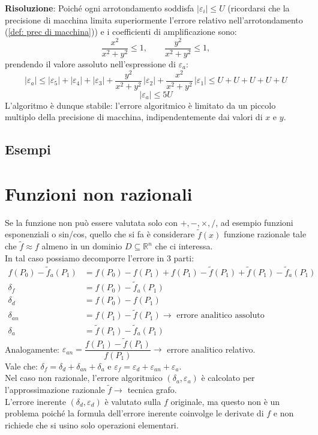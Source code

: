 \documentclass[12pt,a4paper,]{report}
\begin{document}
\noindent
\textbf{Risoluzione}: Poiché ogni arrotondamento soddisfa $|\varepsilon_i| \leq U$ (ricordarsi che la precisione di macchina limita superiormente l'errore relativo nell'arrotondamento (\autoref{def: prec di macchina})) e i coefficienti di amplificazione sono:
\[
  \frac{x^2}{x^2+y^2} \leq 1, \qquad \frac{y^2}{x^2+y^2} \leq 1,
\]
prendendo il valore assoluto nell'espressione di $\varepsilon_a$:
\[
  |\varepsilon_a| \leq |\varepsilon_5| + |\varepsilon_4| + |\varepsilon_3|
  + \frac{y^2}{x^2+y^2}\,|\varepsilon_2| + \frac{x^2}{x^2+y^2}\,|\varepsilon_1|
  \leq U + U + U + U + U
\]
\[
  \boxed{|\varepsilon_a| \leq 5U}
\]
L'algoritmo è dunque stabile: l'errore algoritmico è limitato da un piccolo multiplo della precisione di macchina, indipendentemente dai valori di $x$ e $y$.



\subsection{Esempi}

\section{Funzioni non razionali}
Se la funzione non può essere valutata solo con $+,-,\times, /$, ad esempio funzioni esponenziali o sin/cos, quello che si fa è considerare $\tilde{f}(x)$ funzione razionale tale che $\tilde{f} \approx f$ almeno in un dominio $D \subseteq \mathbb{R}^n$ che ci interessa.
\\
In tal caso possiamo decomporre l'errore in 3 parti:
\begin{align*}
f(P_0) - \tilde{f}_a(P_1) &= f(P_0) - f(P_1) + f(P_1) - \tilde{f}(P_1) + \tilde{f}(P_1) - \tilde{f}_a(P_1) \\[0.5em]
\delta_f &= f(P_0) - \tilde{f}_a(P_1) \\
\delta_d &= f(P_0) - f(P_1) \\
\delta_{an} &= f(P_1) - \tilde{f}(P_1) \to\text{ errore analitico assoluto} \\
\delta_a &= \tilde{f}(P_1) - \tilde{f}_a(P_1)
\end{align*}
Analogamente: $\varepsilon_{an} = \dfrac{f(P_1) - \tilde{f}(P_1)}{f(P_1)}\to$ errore analitico relativo.\\
Vale che: $\delta_f = \delta_d + \delta_{an} + \delta_a$ e $\varepsilon_f = \varepsilon_d + \varepsilon_{an} + \varepsilon_a$.\\
Nel caso non razionale, l'errore algoritmico $(\delta_a, \varepsilon_a)$ è calcolato per l'approssimazione razionale $\tilde{f}\to$ tecnica grafo.\\
L'errore inerente $(\delta_d, \varepsilon_d)$ è valutato sulla $f$ originale, ma questo non è un problema poiché la formula dell'errore inerente coinvolge le derivate di $f$ e non richiede che si usino solo operazioni elementari.
\end{document}
